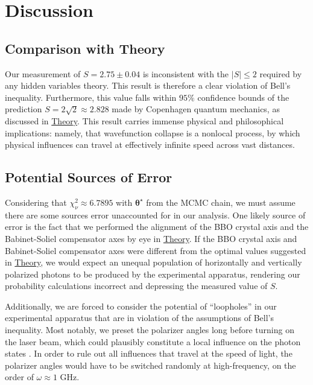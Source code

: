 \documentclass[letter,scriptaddress,twocolumn, prl, nofootinbib]{revtex4}
\newcommand{\rcs}{\chi_\nu^2}
\begin{document}
{\section{Discussion}\label{sec:discussion}
\subsection{Comparison with Theory}
Our measurement of $S = 2.75 \pm 0.04$ is inconsistent with the $|S|  \le 2$ required by any hidden variables theory. This result is therefore a clear violation of Bell's inequality. Furthermore, this value falls within $95\% $ confidence bounds of the prediction $S = 2\sqrt2 \approx 2.828$ made by Copenhagen quantum mechanics, as discussed in \hyperref[subsec:theory]{Theory}. This result carries immense physical and philosophical implications: namely, that wavefunction collapse is a nonlocal process, by which physical influences can travel at effectively infinite speed across vast distances. 
\subsection{Potential Sources of Error}
Considering that $\rcs \approx 6.7895$ with $\boldsymbol{\theta}^\star$ from the MCMC chain, we must assume there are some sources error unaccounted for in our analysis. One likely source of error is the fact that we performed the alignment of the BBO crystal axis and the Babinet-Soliel compensator axes by eye in \hyperref[subsec:]{Theory}. If the BBO crystal axis and Babinet-Soliel compensator axes were different from the optimal values suggested in \hyperref[subsec:theory]{Theory}, we would expect an unequal population of horizontally and vertically polarized photons to be produced by the experimental apparatus, rendering our probability calculations incorrect and depressing the measured value of $S$.

Additionally, we are forced to consider the potential of ``loopholes'' in our experimental apparatus that are in violation of the assumptions of Bell's inequality. Most notably, we preset the polarizer angles long before turning on the laser beam, which could plausibly constitute a local influence on the photon states \cite{kaiser_tackling_2020}. In order to rule out all influences that travel at the speed of light, the polarizer angles would have to be switched randomly at high-frequency, on the order of $ \omega \approx 1$ GHz.


}
\end{document}

